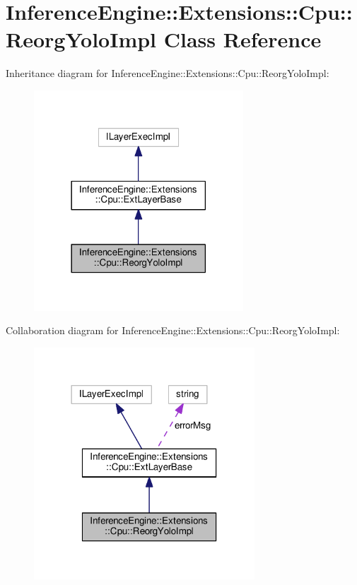 \hypertarget{classInferenceEngine_1_1Extensions_1_1Cpu_1_1ReorgYoloImpl}{}\section{Inference\+Engine\+:\+:Extensions\+:\+:Cpu\+:\+:Reorg\+Yolo\+Impl Class Reference}
\label{classInferenceEngine_1_1Extensions_1_1Cpu_1_1ReorgYoloImpl}


Inheritance diagram for Inference\+Engine\+:\+:Extensions\+:\+:Cpu\+:\+:Reorg\+Yolo\+Impl\+:
\nopagebreak
\begin{figure}[H]
\begin{center}
\leavevmode
\includegraphics[width=222pt]{classInferenceEngine_1_1Extensions_1_1Cpu_1_1ReorgYoloImpl__inherit__graph}
\end{center}
\end{figure}


Collaboration diagram for Inference\+Engine\+:\+:Extensions\+:\+:Cpu\+:\+:Reorg\+Yolo\+Impl\+:
\nopagebreak
\begin{figure}[H]
\begin{center}
\leavevmode
\includegraphics[width=234pt]{classInferenceEngine_1_1Extensions_1_1Cpu_1_1ReorgYoloImpl__coll__graph}
\end{center}
\end{figure}
